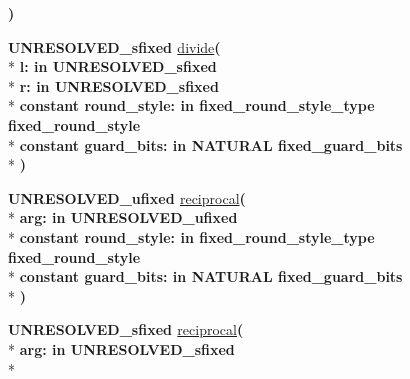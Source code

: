 \begin{DoxyCompactItemize}
{\bfseries  )} 
\item 
{\bfseries {\bfseries \textcolor{vhdlchar}{U\+N\+R\+E\+S\+O\+L\+V\+E\+D\+\_\+sfixed}\textcolor{vhdlchar}{ }}} \hyperlink{class__fixed__pkg_a776ac0d7e64687407983f0b3853bb478}{divide}{\bfseries  ( }\\*
{\bfseries \textcolor{vhdlchar}{l\+: }\textcolor{stringliteral}{in }\textcolor{vhdlchar}{U\+N\+R\+E\+S\+O\+L\+V\+E\+D\+\_\+sfixed}}\\*
{\bfseries \textcolor{vhdlchar}{r\+: }\textcolor{stringliteral}{in }\textcolor{vhdlchar}{U\+N\+R\+E\+S\+O\+L\+V\+E\+D\+\_\+sfixed}}\\*
{\bfseries {\bfseries \textcolor{keywordflow}{constant}\textcolor{vhdlchar}{ }}\textcolor{vhdlchar}{round\+\_\+style\+: }\textcolor{stringliteral}{in }\textcolor{vhdlchar}{fixed\+\_\+round\+\_\+style\+\_\+type     fixed\+\_\+round\+\_\+style}}\\*
{\bfseries {\bfseries \textcolor{keywordflow}{constant}\textcolor{vhdlchar}{ }}\textcolor{vhdlchar}{guard\+\_\+bits\+: }\textcolor{stringliteral}{in }\textcolor{vhdlchar}{N\+A\+T\+U\+R\+A\+L     fixed\+\_\+guard\+\_\+bits}}\\*
{\bfseries  )} 
\item 
{\bfseries {\bfseries \textcolor{vhdlchar}{U\+N\+R\+E\+S\+O\+L\+V\+E\+D\+\_\+ufixed}\textcolor{vhdlchar}{ }}} \hyperlink{class__fixed__pkg_a4437e0396c5ce246806b13f9c9c5a400}{reciprocal}{\bfseries  ( }\\*
{\bfseries \textcolor{vhdlchar}{arg\+: }\textcolor{stringliteral}{in }\textcolor{vhdlchar}{U\+N\+R\+E\+S\+O\+L\+V\+E\+D\+\_\+ufixed}}\\*
{\bfseries {\bfseries \textcolor{keywordflow}{constant}\textcolor{vhdlchar}{ }}\textcolor{vhdlchar}{round\+\_\+style\+: }\textcolor{stringliteral}{in }\textcolor{vhdlchar}{fixed\+\_\+round\+\_\+style\+\_\+type     fixed\+\_\+round\+\_\+style}}\\*
{\bfseries {\bfseries \textcolor{keywordflow}{constant}\textcolor{vhdlchar}{ }}\textcolor{vhdlchar}{guard\+\_\+bits\+: }\textcolor{stringliteral}{in }\textcolor{vhdlchar}{N\+A\+T\+U\+R\+A\+L     fixed\+\_\+guard\+\_\+bits}}\\*
{\bfseries  )} 
\item 
{\bfseries {\bfseries \textcolor{vhdlchar}{U\+N\+R\+E\+S\+O\+L\+V\+E\+D\+\_\+sfixed}\textcolor{vhdlchar}{ }}} \hyperlink{class__fixed__pkg_a2963403e2073870bc4de54dcaca3b371}{reciprocal}{\bfseries  ( }\\*
{\bfseries \textcolor{vhdlchar}{arg\+: }\textcolor{stringliteral}{in }\textcolor{vhdlchar}{U\+N\+R\+E\+S\+O\+L\+V\+E\+D\+\_\+sfixed}}\\*

\end{DoxyCompactItemize}
